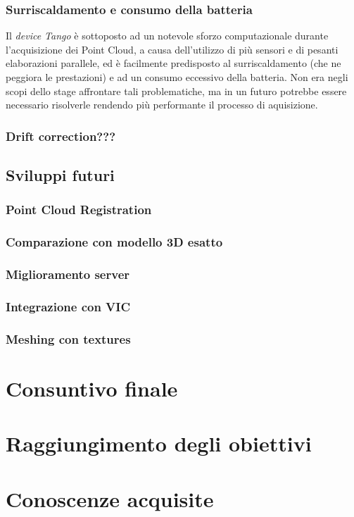 \subsubsection{Surriscaldamento e consumo della batteria}
Il \emph{device Tango} è sottoposto ad un notevole sforzo computazionale durante l'acquisizione dei Point Cloud, a causa dell'utilizzo di più sensori e di pesanti elaborazioni parallele, ed è facilmente predisposto al surriscaldamento (che ne peggiora le prestazioni) e ad un consumo eccessivo della batteria. Non era negli scopi dello stage affrontare tali problematiche, ma in un futuro potrebbe essere necessario risolverle rendendo più performante il processo di aquisizione.

\subsubsection{Drift correction???}

\subsection{Sviluppi futuri}

\subsubsection{Point Cloud Registration}

\subsubsection{Comparazione con modello 3D esatto}

\subsubsection{Miglioramento server}

\subsubsection{Integrazione con VIC}

\subsubsection{Meshing con textures}

\section{Consuntivo finale}

\section{Raggiungimento degli obiettivi}

\section{Conoscenze acquisite}

